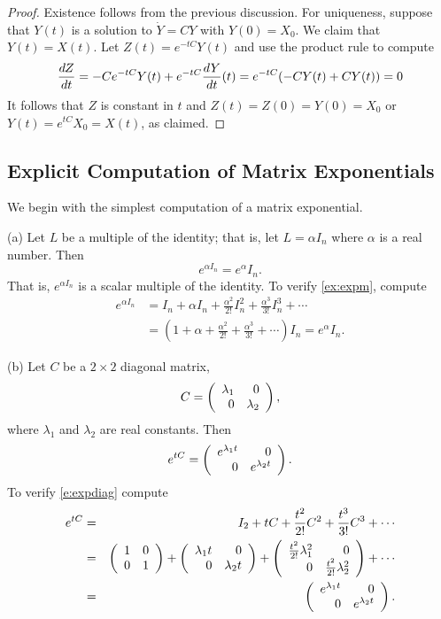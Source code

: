 \documentclass{ximera}
\begin{document}
\begin{proof}  Existence follows from the previous discussion.
For uniqueness, suppose that $Y(t)$ is a solution to $\dot{Y}=CY$
with $Y(0)=X_0$.  We claim that $Y(t)=X(t)$.  Let $Z(t) = e^{-tC}Y(t)$ 
and use the product rule to compute 
\[
\displaystyle\frac{dZ}{dt} = -C e^{-tC}Y(t) + e^{-tC}\frac{dY}{dt}(t) = e^{-tC}(-CY(t) + C Y(t)) = 0
\]  
It follows that $Z$ is constant in $t$ and $Z(t) = Z(0) = Y(0) = X_0$ or 
$Y(t) = e^{tC}X_0 = X(t)$, as claimed.
\end{proof}


\subsection*{Explicit Computation of Matrix Exponentials}

We begin with the simplest computation of a matrix exponential.

\noindent (a) \quad Let $L$ be a multiple of the identity; that
is, let $L = \alpha I_n$ where $\alpha$ is a real number.  Then
\begin{equation} \label{ex:expm}
e^{\alpha I_n} = e^{\alpha} I_n.
\end{equation}
That is, $e^{\alpha I_n}$ is a scalar multiple of the
identity.  To verify \eqref{ex:expm}, compute
\begin{align*}
e^{\alpha I_n} &= I_n + \alpha I_n + \frac{\alpha^2}{2!} I_n^2 +
                 \frac{\alpha^3}{3!} I_n^3 +\cdots \\
  &= (1+\alpha+\frac{\alpha^2}{2!}
+\frac{\alpha^3}{3!}+\cdots)I_n = e^{\alpha} I_n.
\end{align*}

\noindent (b) \quad Let $C$ be a $2\times 2$ diagonal matrix,
     \[
          C = \left(\begin{array}{rr} \lambda_1 & 0\\ 0 &\lambda_2\end{array}\right),
     \]
where $\lambda_1$ and $\lambda_2$ are real constants.  Then
\begin{equation}  \label{e:expdiag}
e^{tC} = \left(\begin{array}{rr} e^{\lambda_1 t} & 0\\ 0 &e^{\lambda_2 t}\end{array}\right).
\end{equation}
To verify \eqref{e:expdiag} compute
\begin{eqnarray*}
   e^{tC} & = & I_2 + tC + \frac{t^2}{2!} C^2 +  \frac{t^3}{3!} C^3 +\cdots\\
        & = & \left(\begin{array}{rr} 1 & 0\\ 0 &1\end{array}\right) + \left(\begin{array}{rr} \lambda_1 t & 0\\ 0 &\lambda_2 t\end{array}\right) +
\left(\begin{array}{rr} \frac{t^2}{2!}\lambda_1^2 & 0\\ 0 &\frac{t^2}{2!}\lambda_2^2\end{array}\right) +\cdots\\
        & = & \left(\begin{array}{rr} e^{\lambda_1 t} & 0\\ 0 &e^{\lambda_2 t}\end{array}\right).
\end{eqnarray*}
\end{document}
